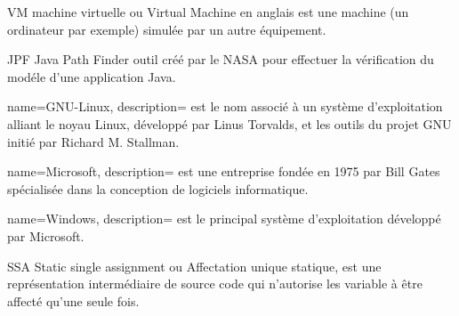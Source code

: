 


    {VM}
    {machine virtuelle}
    { ou Virtual Machine en anglais est une machine (un ordinateur par exemple) simulée par un autre équipement.}
    
    {JPF}
    {Java Path Finder}
    { outil créé par le NASA pour effectuer la vérification du modéle d'une application Java.}

{
        name=GNU-Linux,
        description={ est le nom associé à un système d'exploitation alliant le noyau Linux, développé par Linus Torvalds, et les outils du projet GNU initié par Richard M. Stallman.}
}

{
        name=Microsoft,
        description={ est une entreprise fondée en 1975 par Bill Gates spécialisée dans la conception de logiciels informatique.}
}

{
        name=Windows,
        description={ est le principal système d'exploitation développé par Microsoft.}
}


	{SSA}
	{Static single assignment}
	{ ou Affectation unique statique, est une représentation intermédiaire de source code qui n'autorise les variable à être affecté qu'une seule fois.}